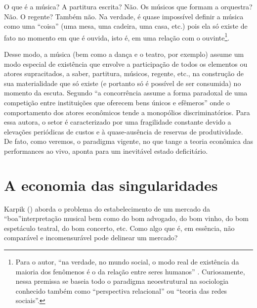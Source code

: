 \documentclass[a4paper, 12pt, openright, oneside, german, french, english, brazil]{abntex2}
\begin{document}
	\begin{citacao}
		O que é a música? A partitura escrita? Não. Os músicos que formam a orquestra? Não. O regente? Também não. Na verdade, é quase impossível definir a música como uma ``coisa'' (uma mesa, uma cadeira, uma casa, etc.) pois ela só existe de fato no momento em que é ouvida, isto é, em uma relação com o ouvinte\footnote{Para o autor, ``na verdade, no mundo social, o modo real de existência da maioria dos fenômenos é o da relação entre seres humanos'' \cite[p. 110]{tolila2007cultura}. Curiosamente, nessa premissa se baseia todo o paradigma neoestrutural na sociologia conhecido também como ``perspectiva relacional'' ou ``teoria das redes sociais''.}. \cite[p. 109]{tolila2007cultura}
	\end{citacao}

	Desse modo, a música (bem como a dança e o teatro, por exemplo) assume um modo especial de existência que envolve a participação de todos os elementos ou atores supracitados, a saber, partitura, músicos, regente, etc., na construção de sua materialidade que só existe (e portanto só é possível de ser consumida) no momento da escuta. Segundo  ``a concorrência assume a forma paradoxal de uma competição entre instituições que oferecem bens únicos e efêmeros'' onde o comportamento dos atores econômicos tende a monopólios discriminatórios. Para essa autora, o setor é caracterizado por uma fragilidade constante devido a elevações periódicas de custos e à quase-ausência de reservas de produtividade. De fato, como veremos, o paradigma vigente, no que tange a teoria econômica das performances ao vivo, aponta para um inevitável estado deficitário.
	
	\section{A economia das singularidades}
	
	
	Karpik (\citeyear{karpik2009elements,karpik2007economie}) aborda o problema do estabelecimento de um mercado da ``boa''interpretação musical bem como do bom advogado, do bom vinho, do bom espetáculo teatral, do bom concerto, etc. Como algo que é, em essência, não comparável e incomensurável pode delinear um mercado?
	
\end{document}

